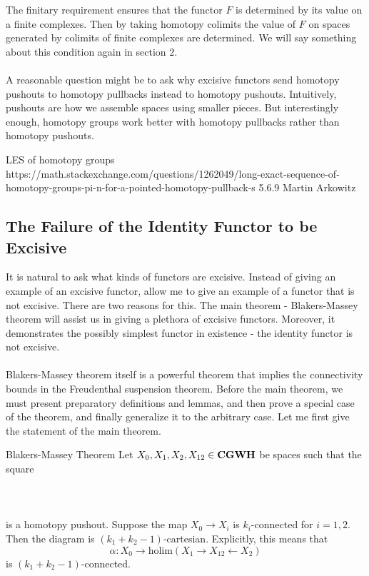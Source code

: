 \documentclass[a4paper]{article}
\begin{document}
The finitary requirement ensures that the functor $F$ is determined by its value on a finite complexes. Then by taking homotopy colimits the value of $F$ on spaces generated by colimits of finite complexes are determined. We will say something about this condition again in section 2. \\~\\

A reasonable question might be to ask why excisive functors send homotopy pushouts to homotopy pullbacks instead to homotopy pushouts. Intuitively, pushouts are how we assemble spaces using smaller pieces. But interestingly enough, homotopy groups work better with homotopy pullbacks rather than homotopy pushouts. 

\begin{thm}{}{} LES of homotopy groups
https://math.stackexchange.com/questions/1262049/long-exact-sequence-of-homotopy-groups-pi-n-for-a-pointed-homotopy-pullback-s
5.6.9 Martin Arkowitz
\end{thm}

\subsection{The Failure of the Identity Functor to be Excisive}
It is natural to ask what kinds of functors are excisive. Instead of giving an example of an excisive functor, allow me to give an example of a functor that is not excisive. There are two reasons for this. The main theorem - Blakers-Massey theorem will assist us in giving a plethora of excisive functors. Moreover, it demonstrates the possibly simplest functor in existence - the identity functor is not excisive. \\~\\

Blakers-Massey theorem itself is a powerful theorem that implies the connectivity bounds in the Freudenthal suspension theorem. Before the main theorem, we must present preparatory definitions and lemmas, and then prove a special case of the theorem, and finally generalize it to the arbitrary case. Let me first give the statement of the main theorem. 

\begin{thm}{Blakers-Massey Theorem}{} Let $X_0,X_1,X_2,X_{12}\in\bold{CGWH}$ be spaces such that the square \\~\\
\\~\\
is a homotopy pushout. Suppose the map $X_0\to X_i$ is $k_i$-connected for $i=1,2$. Then the diagram is $(k_1+k_2-1)$-cartesian. Explicitly, this means that $$\alpha:X_0\to\text{holim}(X_1\rightarrow X_{12}\leftarrow X_2)$$ is $(k_1+k_2-1)$-connected. 
\end{thm}
\end{document}
